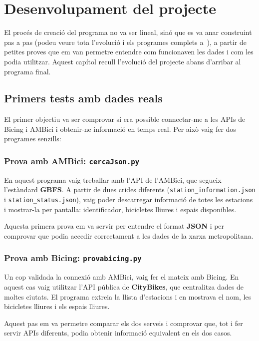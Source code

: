 \chapter{Desenvolupament del projecte}
\label{c:desenvolupament}
El procés de creació del programa no va ser lineal, sinó que es va anar construint pas a pas (podeu veure tota l'evolució i els programes complets a~\cite{TR-MP-2025}), a partir de petites proves que em van permetre entendre com funcionaven les dades i com les podia utilitzar.
Aquest capítol recull l’evolució del projecte abans d’arribar al programa final.


\vspace*{-0.5truecm}
\section{Primers tests amb dades reals}

El primer objectiu va ser comprovar si era possible connectar-me a les APIs de Bicing i AMBici i obtenir-ne informació en temps real.
Per això vaig fer dos programes senzills:

\subsection{Prova amb AMBici: \texttt{cercaJson.py}}

En aquest programa vaig treballar amb l’API de l’AMBici, que segueix l’estàndard \textbf{GBFS}.
A partir de dues crides diferents (\texttt{station\_information.json} i \texttt{station\_status.json}), vaig poder descarregar informació de totes les estacions i mostrar-la per pantalla: identificador, bicicletes lliures i espais disponibles.

Aquesta primera prova em va servir per entendre el format \textbf{JSON} i per comprovar que podia accedir correctament a les dades de la xarxa metropolitana.


\subsection{Prova amb Bicing: \texttt{provabicing.py}}

Un cop validada la connexió amb AMBici, vaig fer el mateix amb Bicing.
En aquest cas vaig utilitzar l’API pública de \textbf{CityBikes}, que centralitza dades de moltes ciutats.
El programa extreia la llista d’estacions i en mostrava el nom, les bicicletes lliures i els espais lliures.

Aquest pas em va permetre comparar els dos serveis i comprovar que, tot i fer servir APIs diferents, podia obtenir informació equivalent en els dos casos.

